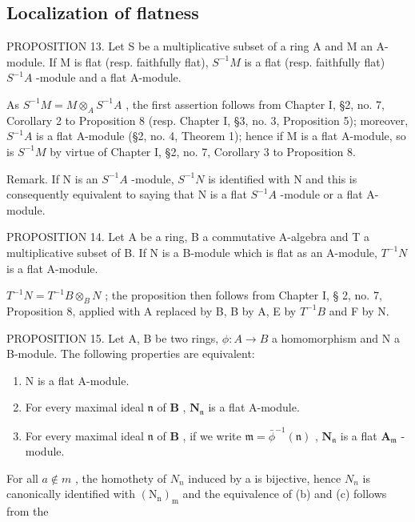 \subsection{Localization of flatness}

PROPOSITION 13. Let S be a multiplicative subset of a ring A and M an A-module. If M is flat (resp. faithfully flat), \(S^{-1}M\) is a flat (resp. faithfully flat) \(S^{-1}A\) -module and a flat A-module.

As \(S^{-1}M = M \otimes_{A} S^{-1}A\) , the first assertion follows from Chapter I, §2, no. 7, Corollary 2 to Proposition 8 (resp. Chapter I, §3, no. 3, Proposition 5); moreover, \(S^{-1}A\) is a flat A-module (§2, no. 4, Theorem 1); hence if M is a flat A-module, so is \(S^{-1}M\) by virtue of Chapter I, §2, no. 7, Corollary 3 to Proposition 8.

Remark. If N is an \(S^{-1}A\) -module, \(S^{-1}N\) is identified with N and this is consequently equivalent to saying that N is a flat \(S^{-1}A\) -module or a flat A-module.

PROPOSITION 14. Let A be a ring, B a commutative A-algebra and T a multiplicative subset of B. If N is a B-module which is flat as an A-module, \(T^{-1}N\) is a flat A-module.

\(T^{-1}N = T^{-1}B \otimes_{B} N\) ; the proposition then follows from Chapter I, § 2, no. 7, Proposition 8, applied with A replaced by B, B by A, E by \(T^{-1}B\) and F by N.

PROPOSITION 15. Let A, B be two rings, \(\phi: A \to B\) a homomorphism and N a B-module. The following properties are equivalent:

\begin{enumerate}
\def\labelenumi{(\alph{enumi})}
\item
  N is a flat A-module.
\item
  For every maximal ideal \(\mathfrak{n}\) of \(\mathbf{B}\) , \(\mathbf{N}_{\mathfrak{n}}\) is a flat A-module.
\item
  For every maximal ideal \(\mathfrak{n}\) of \(\mathbf{B}\) , if we write \(\mathfrak{m} = \bar{\phi}^{-1}(\mathfrak{n})\) , \(\mathbf{N}_{\mathfrak{n}}\) is a flat \(\mathbf{A}_{\mathfrak{m}}\) -module.
\end{enumerate}

For all \(a \notin m\) , the homothety of \(N_{n}\) induced by a is bijective, hence \(N_{n}\) is canonically identified with \((\mathrm{N}_{\mathrm{n}})_{\mathrm{m}}\) and the equivalence of (b) and (c) follows from the

